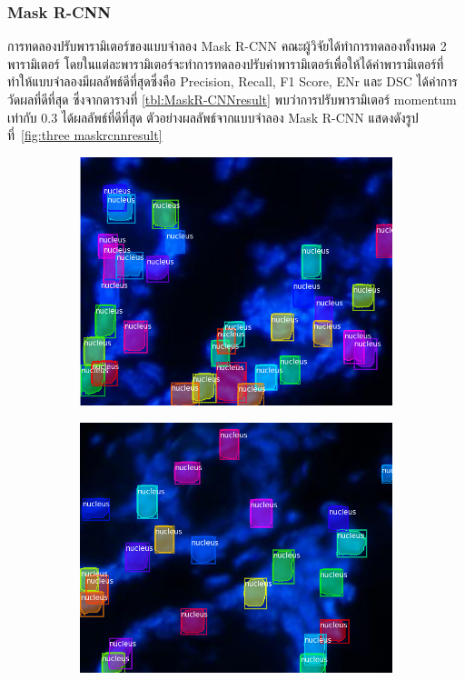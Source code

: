 \documentclass[12pt,oneside,openright,a4paper]{cpe-thai-project}
\begin{document}
\subsubsection{Mask R-CNN}
การทดลองปรับพารามิเตอร์ของแบบจำลอง Mask R-CNN คณะผู้วิจัยได้ทำการทดลองทั้งหมด 2 พารามิเตอร์ โดยในแต่ละพารามิเตอร์จะทำการทดลองปรับค่าพารามิเตอร์เพื่อให้ได้ค่าพารามิเตอร์ที่ทำให้แบบจำลองมีผลลัพธ์ดีที่สุดซึ่งคือ Precision, Recall, F1 Score, ENr และ DSC ได้ค่าการวัดผลที่ดีที่สุด ซึ่งจากตารางที่ \ref{tbl:MaskR-CNNresult}  พบว่าการปรับพารามิเตอร์ momentum เท่ากับ 0.3 ได้ผลลัพธ์ที่ดีที่สุด ตัวอย่างผลลัพธ์จากแบบจำลอง Mask R-CNN แสดงดังรูปที่~\ref{fig:three maskrcnnresult}
\begin{figure}[!h]
     \centering
     \begin{subfigure}[b]{0.3\textwidth}
         \centering
         \includegraphics[width=\textwidth]{images/maskrcnn_ADT_3_3.png}
     \end{subfigure}
     \hfill
     \begin{subfigure}[b]{0.3\textwidth}
         \centering
         \includegraphics[width=\textwidth]{images/maskrcnn_AP123_4_1_1.png}

\end{subfigure}
\end{figure}
\end{document}
